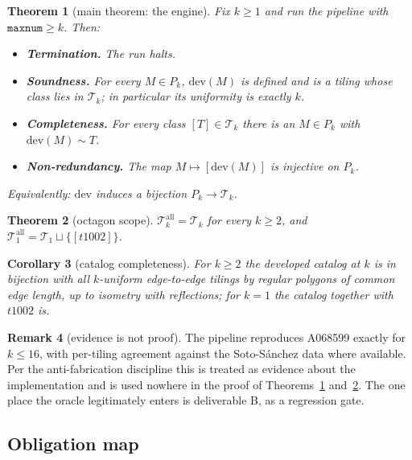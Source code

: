 \documentclass[11pt]{article}
\newtheorem{theorem}{Theorem}[section]
\newtheorem{corollary}[theorem]{Corollary}
\theoremstyle{definition}
\newtheorem{remark}[theorem]{Remark}
\newcommand{\dev}{\mathrm{dev}}
\newcommand{\T}{\mathcal{T}}
\begin{document}
\begin{theorem}[main theorem: the engine]\label{thm:main}
Fix $k \ge 1$ and run the pipeline with $\texttt{maxnum} \ge k$. Then:
\begin{itemize}
\item[(T)] \textbf{Termination.} The run halts.
\item[(S)] \textbf{Soundness.} For every $M \in P_k$, $\dev(M)$ is defined and is a
  tiling whose class lies in $\T_k$; in particular its uniformity is exactly $k$.
\item[(C)] \textbf{Completeness.} For every class $[T] \in \T_k$ there is an $M \in P_k$
  with $\dev(M) \sim T$.
\item[(U)] \textbf{Non-redundancy.} The map $M \mapsto [\dev(M)]$ is injective on $P_k$.
\end{itemize}
Equivalently: $\dev$ induces a bijection $P_k \to \T_k$.
\end{theorem}

\begin{theorem}[octagon scope]\label{thm:octagon}
$\T_k^{\mathrm{all}} = \T_k$ for every $k \ge 2$, and
$\T_1^{\mathrm{all}} = \T_1 \sqcup \{[t1002]\}$.
\end{theorem}

\begin{corollary}[catalog completeness]\label{cor:catalog}
For $k \ge 2$ the developed catalog at $k$ is in bijection with all $k$-uniform
edge-to-edge tilings by regular polygons of common edge length, up to isometry with
reflections; for $k = 1$ the catalog together with $t1002$ is.
\end{corollary}

\begin{remark}[evidence is not proof]
The pipeline reproduces A068599 exactly for $k \le 16$, with per-tiling agreement against
the Soto-S\'anchez data where available. Per the anti-fabrication discipline this is
treated as evidence about the implementation and is used nowhere in the proof of
Theorems~\ref{thm:main} and~\ref{thm:octagon}. The one place the oracle legitimately
enters is deliverable B, as a regression gate.
\end{remark}

\subsection{Obligation map}
\end{document}
